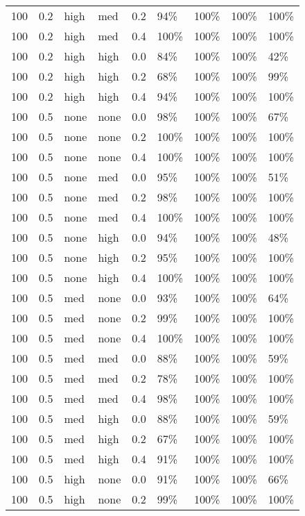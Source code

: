 \begin{longtable}{rrllrllll}
  100 & 0.2 & high & med & 0.2 & 94\% & 100\% & 100\% & 100\% \\ 
  100 & 0.2 & high & med & 0.4 & 100\% & 100\% & 100\% & 100\% \\ 
  100 & 0.2 & high & high & 0.0 & 84\% & 100\% & 100\% & 42\% \\ 
  100 & 0.2 & high & high & 0.2 & 68\% & 100\% & 100\% & 99\% \\ 
  100 & 0.2 & high & high & 0.4 & 94\% & 100\% & 100\% & 100\% \\ 
  100 & 0.5 & none & none & 0.0 & 98\% & 100\% & 100\% & 67\% \\ 
  100 & 0.5 & none & none & 0.2 & 100\% & 100\% & 100\% & 100\% \\ 
  100 & 0.5 & none & none & 0.4 & 100\% & 100\% & 100\% & 100\% \\ 
  100 & 0.5 & none & med & 0.0 & 95\% & 100\% & 100\% & 51\% \\ 
  100 & 0.5 & none & med & 0.2 & 98\% & 100\% & 100\% & 100\% \\ 
  100 & 0.5 & none & med & 0.4 & 100\% & 100\% & 100\% & 100\% \\ 
  100 & 0.5 & none & high & 0.0 & 94\% & 100\% & 100\% & 48\% \\ 
  100 & 0.5 & none & high & 0.2 & 95\% & 100\% & 100\% & 100\% \\ 
  100 & 0.5 & none & high & 0.4 & 100\% & 100\% & 100\% & 100\% \\ 
  100 & 0.5 & med & none & 0.0 & 93\% & 100\% & 100\% & 64\% \\ 
  100 & 0.5 & med & none & 0.2 & 99\% & 100\% & 100\% & 100\% \\ 
  100 & 0.5 & med & none & 0.4 & 100\% & 100\% & 100\% & 100\% \\ 
  100 & 0.5 & med & med & 0.0 & 88\% & 100\% & 100\% & 59\% \\ 
  100 & 0.5 & med & med & 0.2 & 78\% & 100\% & 100\% & 100\% \\ 
  100 & 0.5 & med & med & 0.4 & 98\% & 100\% & 100\% & 100\% \\ 
  100 & 0.5 & med & high & 0.0 & 88\% & 100\% & 100\% & 59\% \\ 
  100 & 0.5 & med & high & 0.2 & 67\% & 100\% & 100\% & 100\% \\ 
  100 & 0.5 & med & high & 0.4 & 91\% & 100\% & 100\% & 100\% \\ 
  100 & 0.5 & high & none & 0.0 & 91\% & 100\% & 100\% & 66\% \\ 
  100 & 0.5 & high & none & 0.2 & 99\% & 100\% & 100\% & 100\% \\ 

\end{longtable}
